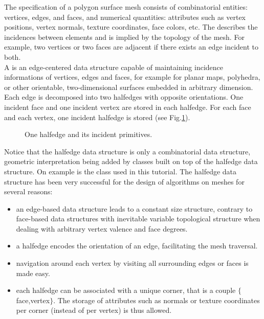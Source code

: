 The specification of a polygon surface mesh consists of combinatorial
entities: vertices, edges, and faces, and numerical quantities:
attributes such as vertex positions, vertex normals, texture
coordinates, face colors, etc. The  describes the
incidences between elements and is implied by the topology of the
mesh. For example, two vertices or two faces are adjacent if there
exists an edge incident to both.\\


A  is an edge-centered data structure
capable of maintaining incidence informations of vertices, edges and
faces, for example for planar maps, polyhedra, or other orientable,
two-dimensional surfaces embedded in arbitrary dimension. Each edge is
decomposed into two halfedges with opposite orientations. One incident
face and one incident vertex are stored in each halfedge. For each
face and each vertex, one incident halfedge is stored (see
Fig.\ref{fig:halfedge}).


\begin{figure}[htb]
    \caption{One halfedge and its incident primitives.}
    \label{fig:halfedge}
\end{figure}
        
Notice that the halfedge data structure is only a combinatorial data
structure, geometric interpretation being added by classes built on
top of the halfedge data structure. On example is the class
 used in this tutorial. The 
halfedge data structure has been very successful for the design of
algorithms on meshes for several reasons:

\begin{itemize}

\item 
an edge-based data structure leads to a constant size structure,
contrary to face-based data structures with inevitable variable
topological structure when dealing with arbitrary vertex valence and
face degrees.

\item 
a halfedge encodes the orientation of an edge, facilitating the mesh
traversal.

\item 
navigation around each vertex by visiting all surrounding edges or
faces is made easy.

\item
each halfedge can be associated with a unique corner, that is a couple
$\{$face,vertex$\}$. The storage of attributes such as normals or
texture coordinates per corner (instead of per vertex) is thus
allowed.

\end{itemize}
